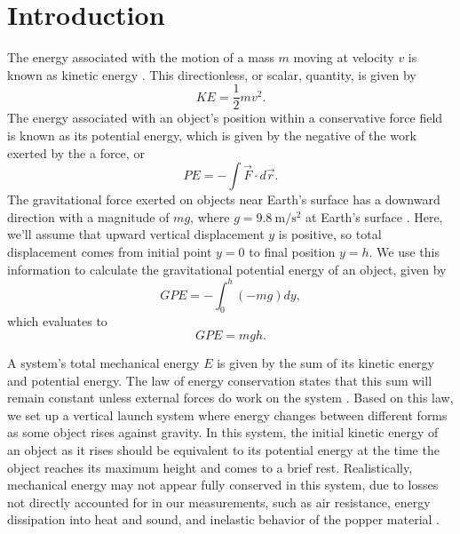 \documentclass[reprint,amsmath,amssymb,aps,twoside]{revtex4-2} %
\begin{document}

\section{Introduction}
The energy associated with the motion of a mass $m$ moving at velocity $v$ is known as kinetic energy \cite{tipler,barrons,openstax}. This directionless, or scalar, quantity, is given by
\begin{equation}
KE = \frac{1}{2} m v^2.
\label{eq:1}
\end{equation}
The energy associated with an object’s position within a conservative force field is known as its potential energy, which is given by the negative of the work exerted by the a force, or \cite{tipler,barrons,openstax}
\begin{equation}
PE = -\int \vec{F}\cdot d\vec{r}.
\label{eq:2}
\end{equation}
The gravitational force exerted on objects near Earth’s surface has a downward direction with a magnitude of $mg$, where $g=\qty{9.8}{\meter\per\second\squared}$ at Earth's surface \cite{tipler,barrons,openstax}. Here, we’ll assume that upward vertical displacement $y$ is positive, so total displacement comes from initial point $y=0$ to final position $y=h$. We use this information to calculate the gravitational potential energy of an object, given by
\begin{equation}
GPE = - \int_0^h (-mg) dy,
\label{eq:3}
\end{equation}    
which evaluates to
\begin{equation}
GPE = mgh. 
\label{eq:4}
\end{equation}

A system’s total mechanical energy $E$ is given by the sum of its kinetic energy and potential energy. The law of energy conservation states that this sum will remain constant unless external forces do work on the system \cite{tipler,barrons,openstax}. Based on this law, we set up a vertical launch system where energy changes between different forms as some object rises against gravity. In this system, the initial kinetic energy of an object as it rises should be equivalent to its potential energy at the time the object reaches its maximum height and comes to a brief rest. Realistically, mechanical energy may not appear fully conserved in this system, due to losses not directly accounted for in our measurements, such as air resistance, energy dissipation into heat and sound, and inelastic behavior of the popper material \cite{urone:2022:college}. 
\end{document}
